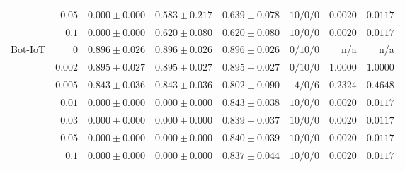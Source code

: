 \begin{table}[t]
\begin{tabular}{@{}lrrrrrrr@{}}
 & $0.05$ & $0.000 \pm 0.000$ & $0.583 \pm 0.217$ & $0.639 \pm 0.078$ & $10/0/0$ & $0.0020$ & $0.0117$ \\
 & $0.1$ & $0.000 \pm 0.000$ & $0.620 \pm 0.080$ & $0.620 \pm 0.080$ & $10/0/0$ & $0.0020$ & $0.0117$ \\
\midrule
\multirow{7}{*}{Bot-IoT}
 & $0$ & $0.896 \pm 0.026$ & $0.896 \pm 0.026$ & $0.896 \pm 0.026$ & $0/10/0$ & n/a & n/a \\
 & $0.002$ & $0.895 \pm 0.027$ & $0.895 \pm 0.027$ & $0.895 \pm 0.027$ & $0/10/0$ & $1.0000$ & $1.0000$ \\
 & $0.005$ & $0.843 \pm 0.036$ & $0.843 \pm 0.036$ & $0.802 \pm 0.090$ & $4/0/6$ & $0.2324$ & $0.4648$ \\
 & $0.01$ & $0.000 \pm 0.000$ & $0.000 \pm 0.000$ & $0.843 \pm 0.038$ & $10/0/0$ & $0.0020$ & $0.0117$ \\
 & $0.03$ & $0.000 \pm 0.000$ & $0.000 \pm 0.000$ & $0.839 \pm 0.037$ & $10/0/0$ & $0.0020$ & $0.0117$ \\
 & $0.05$ & $0.000 \pm 0.000$ & $0.000 \pm 0.000$ & $0.840 \pm 0.039$ & $10/0/0$ & $0.0020$ & $0.0117$ \\
 & $0.1$ & $0.000 \pm 0.000$ & $0.000 \pm 0.000$ & $0.837 \pm 0.044$ & $10/0/0$ & $0.0020$ & $0.0117$ \\
\bottomrule
\end{tabular}
\end{table}
